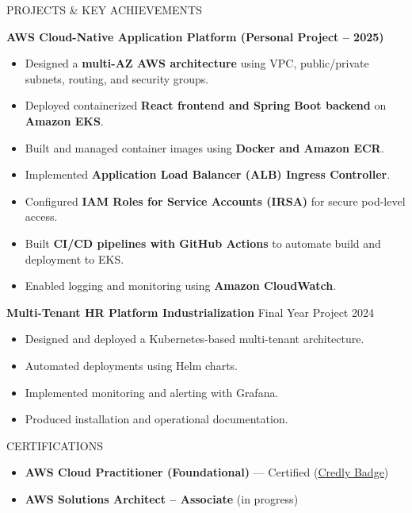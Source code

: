 \documentclass{resume}
\begin{document}
\begin{rSection}{PROJECTS \& KEY ACHIEVEMENTS}

\textbf{AWS Cloud-Native Application Platform (Personal Project – 2025)}
\begin{itemize}
\itemsep -3pt
\item Designed a \textbf{multi-AZ AWS architecture} using VPC, public/private subnets, routing, and security groups.
\item Deployed containerized \textbf{React frontend and Spring Boot backend} on \textbf{Amazon EKS}.
\item Built and managed container images using \textbf{Docker and Amazon ECR}.
\item Implemented \textbf{Application Load Balancer (ALB) Ingress Controller}.
\item Configured \textbf{IAM Roles for Service Accounts (IRSA)} for secure pod-level access.
\item Built \textbf{CI/CD pipelines with GitHub Actions} to automate build and deployment to EKS.
\item Enabled logging and monitoring using \textbf{Amazon CloudWatch}.
\end{itemize}

\vspace{0.3em}

\textbf{Multi-Tenant HR Platform Industrialization} \hfill Final Year Project 2024
\begin{itemize}
\itemsep -3pt
\item Designed and deployed a Kubernetes-based multi-tenant architecture.
\item Automated deployments using Helm charts.
\item Implemented monitoring and alerting with Grafana.
\item Produced installation and operational documentation.
\end{itemize}

\end{rSection}

\begin{rSection}{CERTIFICATIONS}

\begin{itemize}
\itemsep -3pt
\item \textbf{AWS Cloud Practitioner (Foundational)} — Certified 
(\href{https://www.credly.com/badges/6618a670-75d7-4602-ad23-bf817696286b/public_url}{Credly Badge})
\item \textbf{AWS Solutions Architect – Associate} (in progress)
\end{itemize}

\end{rSection}
\end{document}
